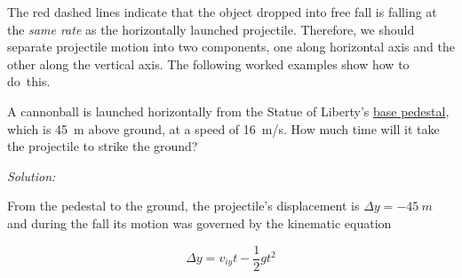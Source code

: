 \documentclass[dvipsnames]{article}
\begin{document}
\begin{center}
\end{center}

The red dashed lines indicate that the object dropped into free fall is falling at the \textit{same rate} as the horizontally launched projectile. Therefore, we should separate projectile motion into two components, one along horizontal axis and the other along the vertical axis. The following worked examples show how to do~this.

\begin{example} \label{ER19WG}
    A cannonball is launched horizontally from the Statue of Liberty's \href{https://www.nps.gov/stli/planyourvisit/images/Statue-from-Fort-Wood-up-3_1.jpg?maxwidth=1300&maxheight=1300&autorotate=false}{base pedestal}, which is \SI{45}{m} above ground, at a speed of \SI{16}{m/s}. How much time will it take the projectile to strike the ground?

\begin{center}
\end{center}
\end{example}

\textit{Solution:}

From the pedestal to the ground, the projectile's displacement is $\Delta y = \SI{-45}{m}$ and during the fall its motion was governed by the kinematic equation

\begin{equation*}
    \Delta y = v_{iy} t - \frac{1}{2} g t^2
\end{equation*}
\end{document}
